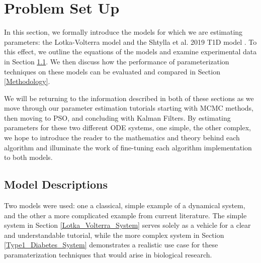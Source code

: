 \section{Problem Set Up} \label{PROBLEM_SETUP}
In this section, we formally introduce the models for which we are estimating parameters: the Lotka-Volterra model and the Shtylla et al. 2019 T1D model \cite{shtylla2019mathematical}. To this effect, we outline the equations of the models and examine experimental data in Section \ref{Model_Desc}. We then discuss how the performance of parameterization techniques on these models can be evaluated and compared in Section \ref{Methodology}. \par We will be returning to the information described in both of these sections as we move through our parameter estimation tutorials starting with MCMC methods, then moving to PSO, and concluding with Kalman Filters. By estimating parameters for these two different ODE systems, one simple, the other complex, we hope to introduce the reader to the mathematics and theory behind each algorithm and illuminate the work of fine-tuning each algorithm implementation to both models. 

\subsection{Model Descriptions} \label{Model_Desc}
\par Two models were used: one a classical, simple example of a dynamical system, and the other a more complicated example from current literature. The simple system in Section \ref{Lotka_Volterra_System} serves solely as a vehicle for a clear and understandable tutorial, while the more complex system in Section \ref{Type1_Diabetes_System} demonstrates a realistic use case for these paramaterization techniques that would arise in biological research. 

